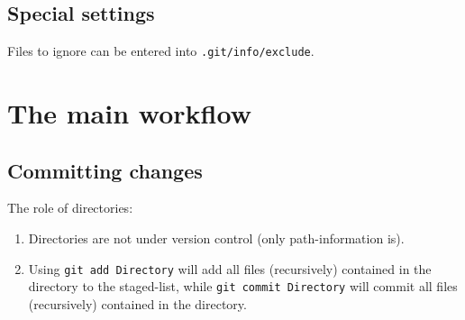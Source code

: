 \documentclass{book}
\newcommand{\filename}[1]{\texttt{#1}}
\begin{document}
\subsection{Special settings}
\label{sec:GitSpecialsettings}

Files to ignore can be entered into \filename{.git/info/exclude}.




\section{The main workflow}
\label{sec:Gitworkflow}


\subsection{Committing changes}
\label{sec:GitComittingchanges}

The role of directories:
\begin{enumerate}
\item Directories are not under version control (only path-information is).
\item Using \texttt{git add Directory} will add all files (recursively) contained in the directory to the staged-list, while \texttt{git commit Directory} will commit all files (recursively) contained in the directory.
\end{enumerate}
\end{document}
